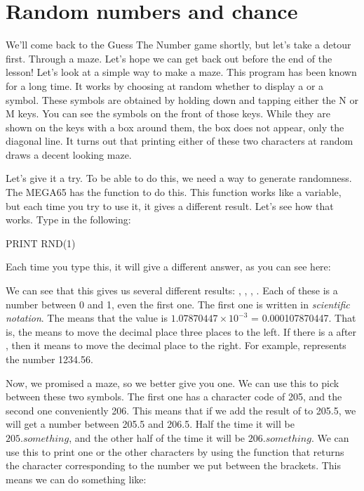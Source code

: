 \section{Random numbers and chance}

We'll come back to the Guess The Number game shortly, but let's take a
detour first. Through a maze. Let's hope we can get back out before
the end of the lesson!  Let's look at a simple way to make a
maze. This program has been known for a long time.  It works by
choosing at random whether to display a {} or a
{} symbol.  These symbols are obtained by holding down
 and tapping either the N or M keys.  You
can see the symbols on the front of those keys.  While they are shown
on the keys with a box around them, the box does not appear, only the
diagonal line.  It turns out that printing either of these two
characters at random draws a decent looking maze.

\needspace{4cm}
Let's give it a try.  To be able to do this, we need a way to generate
randomness.  The MEGA65 has the  function to do this.  This
function works like a variable, but each time you try to use it, it
gives a different result.  Let's see how that works.  Type in the
following:

\begin{screenoutput}
PRINT RND(1)
\end{screenoutput}

Each time you type this, it will give a different answer, as you can
see here:


We can see that this gives us several different results: ,
, , .  Each of these is
a number between 0 and 1, even the first one.  The first one is
written in {\em scientific notation}.  The
 means that the value is $1.07870447\times10^{-3}$ =
0.000107870447.  That is, the  means to move the decimal
place three places to the left. If there is a \stw{+} after ,
then it means to move the decimal place to the right. For example,
 represents the number 1234.56.

\needspace{3cm}
Now, we promised a maze, so we better give you one. We can use this
 to pick between these two symbols.  The first one has a
character code of 205, and the second one conveniently 206.  This
means that if we add the result of  to 205.5, we will get
a number between 205.5 and 206.5.  Half the time it will be
$205.something$, and the other half of the time it will be $206.something$.
We can use this to print one or the other characters by using the
 function that returns the character corresponding to the
number we put between the brackets.  This means we can do something
like:

